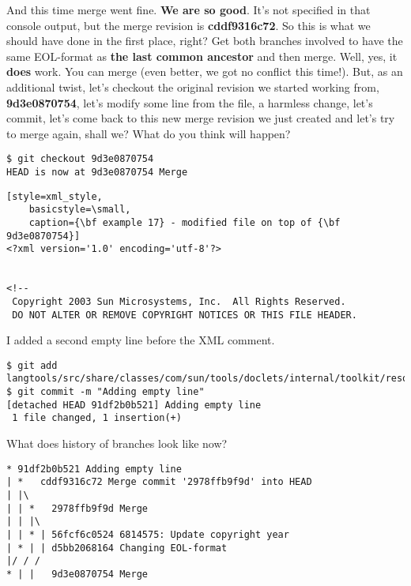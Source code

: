 And this time merge went fine. {\bf We are so good}. It's not specified in that console output, but the merge revision
is {\bf cddf9316c72}. So this is what we should have done in the first place, right? Get both branches involved to
have the same EOL-format as {\bf the last common ancestor} and then merge. Well, yes, it {\bf does} work. You can merge
(even better, we got no conflict this time!). But, as an additional twist, let's checkout the original revision we started
working from, {\bf 9d3e0870754}, let's modify some line from the file, a harmless change, let's commit, let's come back to
this new merge revision we just created and let's try to merge again, shall we? What do you think will happen?

\begin{lstlisting}[style=console_style,
	basicstyle=\small,
	caption={\bf example 17} - changing file]
$ git checkout 9d3e0870754
HEAD is now at 9d3e0870754 Merge
\end{lstlisting}

\begin{lstlisting}[style=xml_style,
	basicstyle=\small,
	caption={\bf example 17} - modified file on top of {\bf 9d3e0870754}]
<?xml version='1.0' encoding='utf-8'?>


<!--
 Copyright 2003 Sun Microsystems, Inc.  All Rights Reserved.
 DO NOT ALTER OR REMOVE COPYRIGHT NOTICES OR THIS FILE HEADER.
\end{lstlisting}

I added a second empty line before the XML comment.

\begin{lstlisting}[style=console_style,
	basicstyle=\small,
	caption={\bf example 17} - wrapping up revision]
$ git add langtools/src/share/classes/com/sun/tools/doclets/internal/toolkit/resources/doclet.xml
$ git commit -m "Adding empty line"
[detached HEAD 91df2b0b521] Adding empty line
 1 file changed, 1 insertion(+)
\end{lstlisting}

What does history of branches look like now?

\begin{lstlisting}[style=console_style,
	basicstyle=\small,
	caption={\bf example 17} - current history]
* 91df2b0b521 Adding empty line
| *   cddf9316c72 Merge commit '2978ffb9f9d' into HEAD
| |\  
| | *   2978ffb9f9d Merge
| | |\  
| | * | 56fcf6c0524 6814575: Update copyright year
| * | | d5bb2068164 Changing EOL-format
|/ / /  
* | |   9d3e0870754 Merge
\end{lstlisting}

